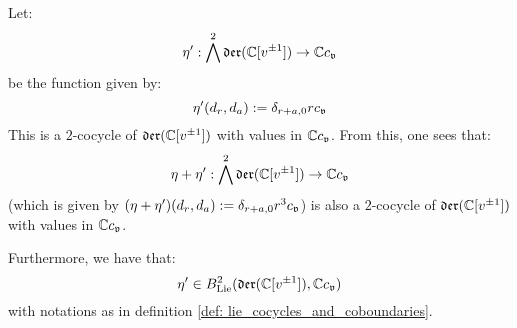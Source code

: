         \begin{proposition} \label{prop: a_virasoro_coboundary}
            Let:
                $$\eta': \bigwedge^2 \mathfrak{der}(\mathbb{C}[v^{\pm 1}]) \to \mathbb{C} c_{\mathfrak{v}}$$
            be the function given by:
                $$\eta'(d_r, d_a) := \delta_{r + a, 0} r c_{\mathfrak{v}}$$
            This is a $2$-cocycle of $\mathfrak{der}(\mathbb{C}[v^{\pm 1}])$ with values in $\mathbb{C} c_{\mathfrak{v}}$. From this, one sees that:
                $$\eta + \eta': \bigwedge^2 \mathfrak{der}(\mathbb{C}[v^{\pm 1}]) \to \mathbb{C} c_{\mathfrak{v}}$$
            (which is given by $(\eta + \eta')(d_r, d_a) := \delta_{r + a, 0} r^3 c_{\mathfrak{v}}$) is also a $2$-cocycle of $\mathfrak{der}(\mathbb{C}[v^{\pm 1}])$ with values in $\mathbb{C} c_{\mathfrak{v}}$. 

            Furthermore, we have that:
                $$\eta' \in B^2_{\mathrm{Lie}}( \mathfrak{der}(\mathbb{C}[v^{\pm 1}]), \mathbb{C} c_{\mathfrak{v}} )$$
            with notations as in definition \ref{def: lie_cocycles_and_coboundaries}.
        \end{proposition}
